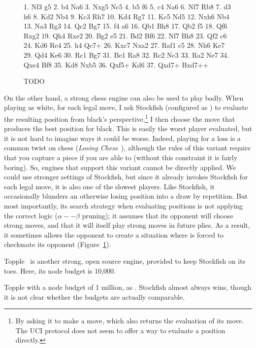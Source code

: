 \documentclass[10pt,preprint,twocolumn]{acmart}
\begin{document}
\begin{figure}[ht]
1. Nf3 g5 2. b4 Na6 3. Nxg5 Nc5 4. b5 f6
5. c4 Na6 6. Nf7 Rb8 7. d3 h6 8. Kd2 Nb4
9. Kc3 Rh7 10. Kd4 Rg7 11. Kc5 Nd5 12. Nxh6 Nb4
13. Na3 Rg3 14. Qc2 Bg7 15. f4 a6 16. Qb1 Bh8
17. Qb2 f5 18. Qf6 Rxg2 19. Qh4 Rxe2 20. Bg2 e5
21. Bd2 Bf6 22. Nf7 Bh8 23. Qf2 c6 24. Kd6 Re4
25. h4 Qc7+ 26. Kxc7 Nxa2 27. Raf1 c5 28. Nh6 Ke7
29. Qd4 Ke6 30. Rc1 Bg7 31. Be1 Ra8 32. Rc2 Nc3
33. Ra2 Ne7 34. Qxe4 Bf8 35. Kd8 Nxb5 36. Qxf5+ Kd6
37. Qxd7+ Bxd7++
\caption{TODO} \label{fig:worstfish}
\end{figure}

 On the other hand, a strong chess engine
can also be used to play badly. When playing as white, for each legal
move, I ask Stockfish (configured as ) to evaluate
the resulting position from black's perspective.\footnote{By asking it
  to make a move, which also returns the evaluation of its move. The
  UCI protocol does not seem to offer a way to evaluate a position
  directly.} I then choose the move that produces the best position
for black. This is easily the worst player evaluated, but it is not
hard to imagine ways it could be worse. Indeed, playing for a loss is
a common twist on chess ({\it Losing
  Chess}~\cite{losingchesswikipedia}), although the rules of this
variant require that you capture a piece if you are able to (without
this constraint it is fairly boring). So, engines that support this
variant cannot be directly applied. We could use stronger settings of
Stockfish, but since it already invokes Stockfish for each legal move,
it is also one of the slowest players. Like Stockfish, it occasionally
blunders an otherwise losing position into a draw by repetition. But
most importantly, its search strategy when evaluating positions is not
applying the correct logic ($\alpha--\beta$ pruning); it assumes that
its opponent will choose strong moves, and that it will itself play
strong moves in future plies. As a result, it sometimes allows the
opponent to create a situation where  is forced to
checkmate its opponent (Figure~\ref{fig:worstfish}).

 Topple~\cite{topple} is another strong,
open source engine, provided to keep Stockfish on its toes. Here,
its node budget is 10,000. \traditional

 Topple with a node budget of 1 million,
as . Stockfish almost always wins, though it
is not clear whether the budgets are actually comparable. \traditional
\end{document}
